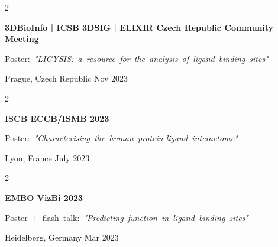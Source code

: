 \documentclass[10pt, letterpaper]{article}
\newenvironment{twocolentry}[2][]{
    \onecolentry
    \def\secondColumn{#2}
    \setcolumnwidth{\fill, 4.5 cm}
    \begin{paracol}{2}
}{
    \switchcolumn \raggedleft \secondColumn
    \end{paracol}
    \endonecolentry
} %
\begin{document}
        \vspace{0.2 cm}

        \begin{samepage}
            \begin{twocolentry}{
                Nov 2023
            }
                \textbf{3DBioInfo | ICSB 3DSIG | ELIXIR Czech Republic Community Meeting}

                \vspace{0.10 cm}

                \mbox{Poster: \textit{"LIGYSIS: a resource for the analysis of ligand binding sites"}}
                \vspace{0.10 cm}

        Prague, Czech Republic    \end{twocolentry}
        \end{samepage}

        \vspace{0.2 cm}

        \begin{samepage}
            \begin{twocolentry}{
                July 2023
            }
                \textbf{ISCB ECCB/ISMB 2023}

                \vspace{0.10 cm}

                \mbox{Poster: \textit{"Characterising the human protein-ligand interactome"}}
                \vspace{0.10 cm}

        Lyon, France    \end{twocolentry}
        \end{samepage}

        \vspace{0.2 cm}

        \begin{samepage}
            \begin{twocolentry}{
                Mar 2023
            }
                \textbf{EMBO VizBi 2023}

                \vspace{0.10 cm}

                \mbox{Poster + flash talk: \textit{"Predicting function in ligand binding sites"}}
                \vspace{0.10 cm}

        Heidelberg, Germany    \end{twocolentry}
        \end{samepage}
\end{document}
